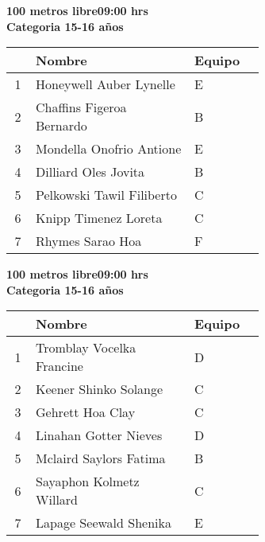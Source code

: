 \begin{minipage}{0.95\linewidth}\vspace{0.5cm} 
\begin{flushleft}
\textbf{
\hspace{-0.15cm}100 metros libre\hspace{1.5cm}09:00 hrs \\Categoria 15-16 años}\vspace{-0.2cm} 
\end{flushleft}
\begin{tabular}{cp{0.63\linewidth}l}
\hline
& \textbf{Nombre} & \textbf{Equipo} \\ \hline
1 & Honeywell Auber Lynelle & E \\ 
2 & Chaffins Figeroa Bernardo & B \\ 
3 & Mondella Onofrio Antione & E \\ 
4 & Dilliard Oles Jovita & B \\ 
5 & Pelkowski Tawil Filiberto & C \\ 
6 & Knipp Timenez Loreta & C \\ 
7 & Rhymes Sarao Hoa & F \\ 
\end{tabular}
\end{minipage}
\begin{minipage}{0.95\linewidth}\vspace{0.5cm} 
\begin{flushleft}
\textbf{
\hspace{-0.15cm}100 metros libre\hspace{1.5cm}09:00 hrs \\Categoria 15-16 años}\vspace{-0.2cm} 
\end{flushleft}
\begin{tabular}{cp{0.63\linewidth}l}
\hline
& \textbf{Nombre} & \textbf{Equipo} \\ \hline
1 & Tromblay Vocelka Francine & D \\ 
2 & Keener Shinko Solange & C \\ 
3 & Gehrett Hoa Clay & C \\ 
4 & Linahan Gotter Nieves & D \\ 
5 & Mclaird Saylors Fatima & B \\ 
6 & Sayaphon Kolmetz Willard & C \\ 
7 & Lapage Seewald Shenika & E \\ 
\end{tabular}
\end{minipage}
